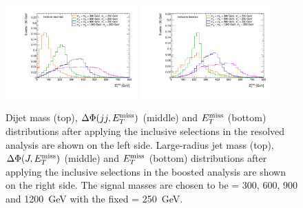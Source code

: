 \begin{figure}
\includegraphics[width=0.45\textwidth]{texinputs/04_grid/figures/monoz/hadronic/ma250_incl_resl_MET_linear.pdf}
\includegraphics[width=0.45\textwidth]{texinputs/04_grid/figures/monoz/hadronic/ma250_incl_merged_MET_linear.pdf}
\caption{Dijet mass (top), $\Delta\Phi(jj, E_T^\mathrm{miss})$ (middle) and $E_T^\mathrm{miss}$ (bottom) distributions 
after applying the inclusive selections in the resolved analysis are shown on the left side. Large-radius 
jet mass (top), $\Delta\Phi(J, E_T^\mathrm{miss})$ (middle) and $E_T^\mathrm{miss}$ (bottom) distributions 
after applying the inclusive selections in the boosted analysis are shown on the right side. 
The signal masses are chosen to be \mA = 300, 600, 900 and 1200~GeV with the fixed \ma = 250~GeV.}
\label{fig:monozhad_kin_inc_fixed_ma}
\end{figure}

